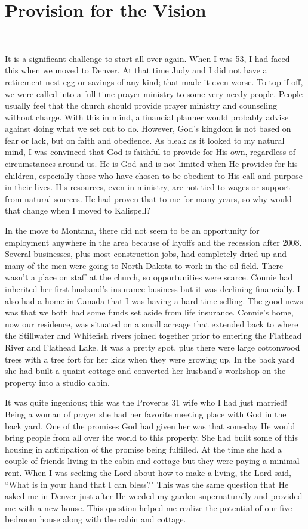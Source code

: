 \documentclass[oneside,12pt]{book}
\begin{document}
\section{Provision for the Vision}
\

It is a significant challenge to start all over again. When I was 53, I had faced this when we moved to Denver. At that time Judy and I did not have a retirement nest egg or savings of any kind; that made it even worse. To top if off, we were called into a full-time prayer ministry to some very needy people. People usually feel that the church should provide prayer ministry and counseling without charge. With this in mind, a financial planner would probably advise against doing what we set out to do. However, God's kingdom is not based on fear or lack, but on faith and obedience. As bleak as it looked to my natural mind, I was convinced that God is faithful to provide for His own, regardless of circumstances around us. He is God and is not limited when He provides for his children, especially those who have chosen to be obedient to His call and purpose in their lives. His resources, even in ministry, are not tied to wages or support from natural sources. He had proven that to me for many years, so why would that change when I moved to Kalispell?

In the move to Montana, there did not seem to be an opportunity for employment anywhere in the area because of layoffs and the recession after 2008. Several businesses, plus most construction jobs, had completely dried up and many of the men were going to North Dakota to work in the oil field. There wasn't a place on staff at the church, so opportunities were scarce. Connie had inherited her first husband's insurance business but it was declining financially. I also had a home in Canada that I was having a hard time selling. The good news was that we both had some funds set aside from life insurance. Connie's home, now our residence, was situated on a small acreage that extended back to where the Stillwater and Whitefish rivers joined together prior to entering the Flathead River and Flathead Lake. It was a pretty spot, plus there were large cottonwood trees with a tree fort for her kids when they were growing up. In the back yard she had built a quaint cottage and converted her husband's workshop on the property into a studio cabin. 

It was quite ingenious; this was the Proverbs 31 wife who I had just married! Being a woman of prayer she had her favorite meeting place with God in the back yard. One of the promises God had given her was that someday He would bring people from all over the world to this property. She had built some of this housing in anticipation of the promise being fulfilled. At the time she had a couple of friends living in the cabin and cottage but they were paying a minimal rent. When I was seeking the Lord about how to make a living, the Lord said, ``What is in your hand that I can bless?" This was the same question that He asked me in Denver just after He weeded my garden supernaturally and provided me with a new house. This question helped me realize the potential of our five bedroom house along with the cabin and cottage.
 
\end{document}
